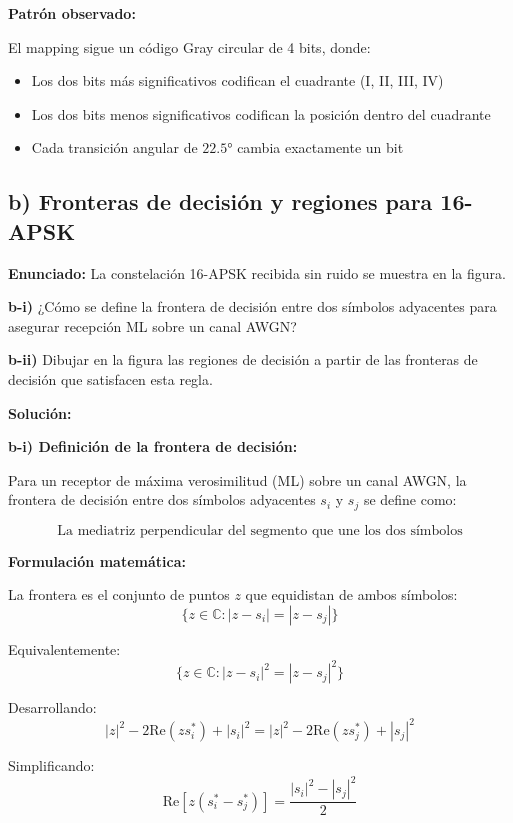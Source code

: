 \documentclass[11pt,a4paper]{article}
\begin{document}
\textbf{Patr\'on observado:}

El mapping sigue un c\'odigo Gray circular de 4 bits, donde:
\begin{itemize}
    \item Los dos bits m\'as significativos codifican el cuadrante (I, II, III, IV)
    \item Los dos bits menos significativos codifican la posici\'on dentro del cuadrante
    \item Cada transici\'on angular de $22.5°$ cambia exactamente un bit
\end{itemize}



\subsection*{b) Fronteras de decisi\'on y regiones para 16-APSK}

\textbf{Enunciado:} La constelaci\'on 16-APSK recibida sin ruido se muestra en la figura.

\textbf{b-i)} ¿C\'omo se define la frontera de decisi\'on entre dos s\'imbolos adyacentes para asegurar recepci\'on ML sobre un canal AWGN?

\textbf{b-ii)} Dibujar en la figura las regiones de decisi\'on a partir de las fronteras de decisi\'on que satisfacen esta regla.

\vspace{0.3cm}
\textbf{Soluci\'on:}

\textbf{b-i) Definici\'on de la frontera de decisi\'on:}

Para un receptor de m\'axima verosimilitud (ML) sobre un canal AWGN, la frontera de decisi\'on entre dos s\'imbolos adyacentes $s_i$ y $s_j$ se define como:

\[
\boxed{\text{La mediatriz perpendicular del segmento que une los dos s\'imbolos}}
\]

\textbf{Formulaci\'on matem\'atica:}

La frontera es el conjunto de puntos $z$ que equidistan de ambos s\'imbolos:
\[
\{z \in \mathbb{C} : |z - s_i| = |z - s_j|\}
\]

Equivalentemente:
\[
\{z \in \mathbb{C} : |z - s_i|^2 = |z - s_j|^2\}
\]

Desarrollando:
\[
|z|^2 - 2\text{Re}(z s_i^*) + |s_i|^2 = |z|^2 - 2\text{Re}(z s_j^*) + |s_j|^2
\]

Simplificando:
\[
\text{Re}[z(s_i^* - s_j^*)] = \frac{|s_i|^2 - |s_j|^2}{2}
\]
\end{document}
